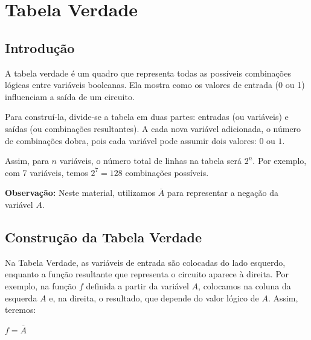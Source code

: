 \documentclass[12pt]{article}
\begin{document}
\section{Tabela Verdade}
\subsection{Introdução}
A tabela verdade é um quadro que representa todas as possíveis combinações lógicas entre variáveis booleanas. Ela mostra como os valores de entrada (0 ou 1) influenciam a saída de um circuito.

Para construí-la, divide-se a tabela em duas partes: entradas (ou variáveis) e saídas (ou combinações resultantes). A cada nova variável adicionada, o número de combinações dobra, pois cada variável pode assumir dois valores: \(0\) ou \(1\).

Assim, para \( n \) variáveis, o número total de linhas na tabela será \( 2^n \). Por exemplo, com 7 variáveis, temos \( 2^7 = 128 \) combinações possíveis.

\textbf{Observação:} Neste material, utilizamos \( \overline{A} \) para representar a negação da variável \( A \).

\subsection{Construção da Tabela Verdade}
Na Tabela Verdade, as variáveis de entrada são colocadas do lado esquerdo, enquanto a função resultante que representa o circuito aparece à direita.
Por exemplo, na função $f$ definida a partir da variável $A$, colocamos na coluna da esquerda $A$ e, na direita, o resultado, que depende do valor lógico de $A$. Assim, teremos:

\begin{center}
$ f = \overline{A}$
\vspace{0.5em}
\end{center}
\end{document}
